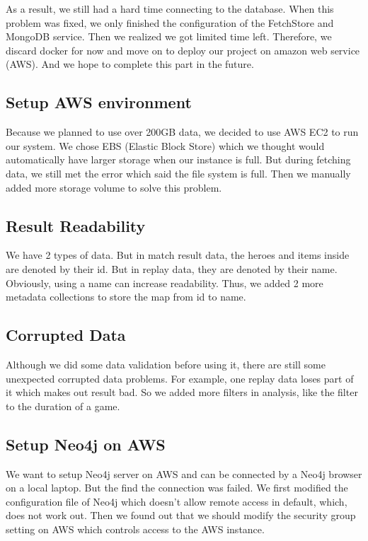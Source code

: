 \documentclass{article}
\begin{document}
As a result, we still had a hard time connecting to the database.
When this problem was fixed, we only finished the configuration of the FetchStore and MongoDB service.
Then we realized we got limited time left. Therefore, we discard docker for now and move on to deploy our project on amazon web service (AWS).
And we hope to complete this part in the future.

\subsection{Setup AWS environment}

Because we planned to use over 200GB data, we decided to use AWS EC2 to run our system. We chose EBS (Elastic Block Store) which we thought would automatically have larger storage when our instance is full. But during fetching data, we still met the error which said the file system is full. Then we manually added more storage volume to solve this problem.

\subsection{Result Readability}

We have 2 types of data. But in match result data, the heroes and items inside are denoted by their id. But in replay data, they are denoted by their name. Obviously, using a name can increase readability. Thus, we added 2 more metadata collections to store the map from id to name.

\subsection{Corrupted Data}

Although we did some data validation before using it, there are still some unexpected corrupted data problems. For example, one replay data loses part of it which makes out result bad. So we added more filters in analysis, like the filter to the duration of a game.

\subsection{Setup Neo4j on AWS}

We want to setup Neo4j server on AWS and can be connected by a Neo4j browser on a local laptop. But the find the connection was failed. We first modified the configuration file of Neo4j which doesn't allow remote access in default, which, does not work out. Then we found out that we should modify the security group setting on AWS which controls access to the AWS instance.
\end{document}
